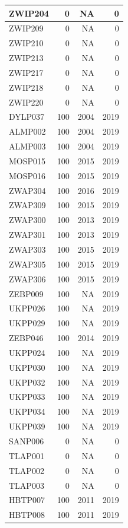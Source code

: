 \documentclass[11pt,]{book}
\begin{document}
\begin{table}
\begin{tabular}[t]{l|r|r|r}
\hline
ZWIP204 & 0 & NA & 0\\
\hline
ZWIP209 & 0 & NA & 0\\
\hline
ZWIP210 & 0 & NA & 0\\
\hline
ZWIP213 & 0 & NA & 0\\
\hline
ZWIP217 & 0 & NA & 0\\
\hline
ZWIP218 & 0 & NA & 0\\
\hline
ZWIP220 & 0 & NA & 0\\
\hline
DYLP037 & 100 & 2004 & 2019\\
\hline
ALMP002 & 100 & 2004 & 2019\\
\hline
ALMP003 & 100 & 2004 & 2019\\
\hline
MOSP015 & 100 & 2015 & 2019\\
\hline
MOSP016 & 100 & 2015 & 2019\\
\hline
ZWAP304 & 100 & 2016 & 2019\\
\hline
ZWAP309 & 100 & 2015 & 2019\\
\hline
ZWAP300 & 100 & 2013 & 2019\\
\hline
ZWAP301 & 100 & 2013 & 2019\\
\hline
ZWAP303 & 100 & 2015 & 2019\\
\hline
ZWAP305 & 100 & 2015 & 2019\\
\hline
ZWAP306 & 100 & 2015 & 2019\\
\hline
ZEBP009 & 100 & NA & 2019\\
\hline
UKPP026 & 100 & NA & 2019\\
\hline
UKPP029 & 100 & NA & 2019\\
\hline
ZEBP046 & 100 & 2014 & 2019\\
\hline
UKPP024 & 100 & NA & 2019\\
\hline
UKPP030 & 100 & NA & 2019\\
\hline
UKPP032 & 100 & NA & 2019\\
\hline
UKPP033 & 100 & NA & 2019\\
\hline
UKPP034 & 100 & NA & 2019\\
\hline
UKPP039 & 100 & NA & 2019\\
\hline
SANP006 & 0 & NA & 0\\
\hline
TLAP001 & 0 & NA & 0\\
\hline
TLAP002 & 0 & NA & 0\\
\hline
TLAP003 & 0 & NA & 0\\
\hline
HBTP007 & 100 & 2011 & 2019\\
\hline
HBTP008 & 100 & 2011 & 2019\\

\end{tabular}
\end{table}
\end{document}
